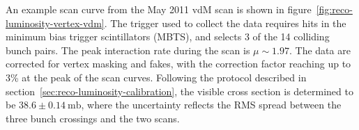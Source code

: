 An example scan curve from the May 2011 vdM scan is shown in figure~\ref{fig:reco-luminosity-vertex-vdm}. The trigger used to collect the data requires hits in the minimum bias trigger scintillators (MBTS), and selects 3 of the 14 colliding bunch pairs. The peak interaction rate during the scan is $\mu\sim1.97$. The data are corrected for vertex masking and fakes, with the correction factor reaching up to 3\% at the peak of the scan curves. Following the protocol described in section~\ref{sec:reco-luminosity-calibration}, the visible cross section is determined to be $38.6\pm 0.14~\mbox{mb}$, where the uncertainty reflects the RMS spread between the three bunch crossings and the two scans.

\begin{figure}[p]
	\centering
\end{figure}
